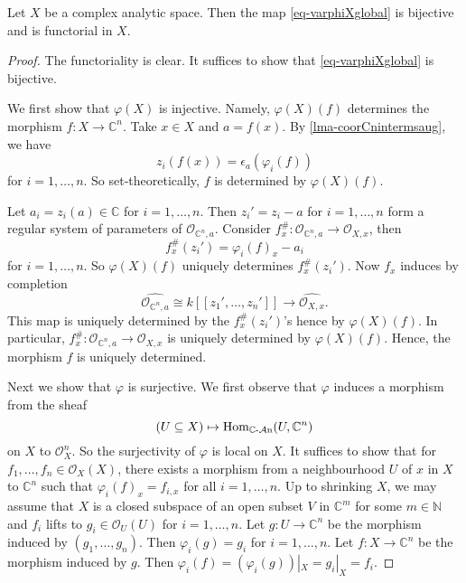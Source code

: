 \begin{thm}\label{thm-hCnidentification}
    Let $X$ be a complex analytic space. Then the map \eqref{eq-varphiXglobal} is bijective and is functorial in $X$.
\end{thm}
\begin{proof}
    The functoriality is clear. It suffices to show that \eqref{eq-varphiXglobal} is bijective.

    We first show that $\varphi(X)$ is injective. Namely, $\varphi(X)(f)$ determines the morphism $f:X\rightarrow \mathbb{C}^n$. Take $x\in X$ and $a=f(x)$. By \cref{lma-coorCnintermsaug}, we have
    \[
        z_i(f(x))=\epsilon_{a}(\varphi_i(f))  
    \]
    for $i=1,\ldots,n$. So set-theoretically, $f$ is determined by $\varphi(X)(f)$.

    Let $a_i=z_i(a)\in \mathbb{C}$ for $i=1,\ldots,n$. Then $z_i'=z_i-a$ for $i=1,\ldots,n$ form a regular system of parameters of $\mathcal{O}_{\mathbb{C}^n,a}$. Consider $f_x^{\#}:\mathcal{O}_{\mathbb{C}^n,a}\rightarrow \mathcal{O}_{X,x}$, then
    \[
        f_x^{\#}(z_i')=\varphi_i(f)_x-a_i  
    \]
    for $i=1,\ldots,n$. So $\varphi(X)(f)$ uniquely determines $f_x^{\#}(z_i')$. Now $f_x$ induces by completion
    \[
        \widehat{\mathcal{O}_{\mathbb{C}^n,a}}\cong k[[z_1',\ldots,z_n']]\rightarrow \widehat{\mathcal{O}_{X,x}}.  
    \]
    This map is uniquely determined by the $f_x^{\#}(z_i')$'s hence by $\varphi(X)(f)$. In particular, $f_x^{\#}:\mathcal{O}_{\mathbb{C}^n,a}\rightarrow \mathcal{O}_{X,x}$ is uniquely determined by $\varphi(X)(f)$. Hence, the morphism $f$ is uniquely determined.

    Next we show that $\varphi$ is surjective. We first observe that $\varphi$ induces a morphism from the sheaf
    \[
          (U\subseteq X)\mapsto \operatorname{Hom}_{\mathbb{C}\text{-}\mathcal{A}\mathrm{n}}(U,\mathbb{C}^n)
    \]
    on $X$ to $\mathcal{O}_X^n$. So the surjectivity of $\varphi$ is local on $X$. It suffices to show that for $f_1,\ldots,f_n\in \mathcal{O}_X(X)$, there exists a morphism from a neighbourhood $U$ of $x$ in $X$ to $\mathbb{C}^n$ such that $\varphi_i(f)_x=f_{i,x}$ for all $i=1,\ldots,n$. Up to shrinking $X$, we may assume that $X$ is a closed subspace of an open subset $V$ in $\mathbb{C}^m$ for some $m\in \mathbb{N}$ and $f_i$ lifts to $g_i\in \mathcal{O}_U(U)$ for $i=1,\ldots,n$. Let $g:U\rightarrow \mathbb{C}^n$ be the morphism induced by $(g_1,\ldots,g_n)$. Then $\varphi_i(g)=g_i$ for $i=1,\ldots,n$. Let $f:X\rightarrow \mathbb{C}^n$ be the morphism induced by $g$. Then $\varphi_i(f)=(\varphi_i(g))|_X=g_i|_X=f_i$.
\end{proof}

